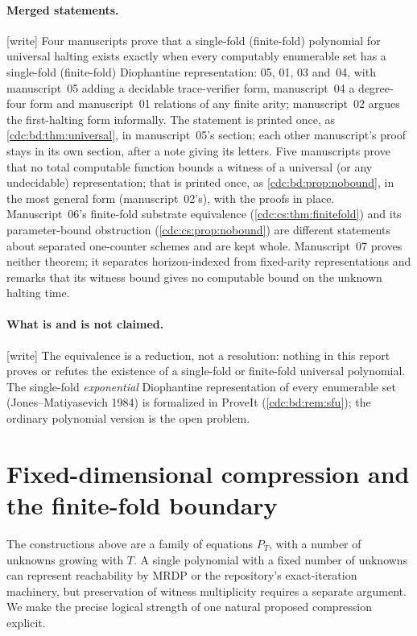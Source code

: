 \documentclass[11pt,a4paper]{article}
\theoremstyle{definition}
\theoremstyle{remark}
\newcommand{\wtag}{\textup{[write]}}%
\newcommand{\srctag}[1]{\texorpdfstring{\hspace{0.5em}{\normalfont\small\color{accent}[#1]}}{ [#1]}}
\begin{document}
\paragraph{Merged statements.} \wtag{} Four manuscripts prove that a single-fold (finite-fold) polynomial for universal halting exists exactly when every computably enumerable set has a single-fold (finite-fold) Diophantine representation: 05, 01, 03 and~04, with manuscript~05 adding a decidable trace-verifier form, manuscript~04 a degree-four form and manuscript~01 relations of any finite arity; manuscript~02 argues the first-halting form informally. The statement is printed once, as \cref{cdc:bd:thm:universal}, in manuscript~05's section; each other manuscript's proof stays in its own section, after a note giving its letters. Five manuscripts prove that no total computable function bounds a witness of a universal (or any undecidable) representation; that is printed once, as \cref{cdc:bd:prop:nobound}, in the most general form (manuscript~02's), with the proofs in place. Manuscript~06's finite-fold substrate equivalence (\cref{cdc:cs:thm:finitefold}) and its parameter-bound obstruction (\cref{cdc:cs:prop:nobound}) are different statements about separated one-counter schemes and are kept whole. Manuscript~07 proves neither theorem; it separates horizon-indexed from fixed-arity representations and remarks that its witness bound gives no computable bound on the unknown halting time.

\paragraph{What is and is not claimed.} \wtag{} The equivalence is a reduction, not a resolution: nothing in this report proves or refutes the existence of a single-fold or finite-fold universal polynomial. The single-fold \emph{exponential} Diophantine representation of every enumerable set (Jones--Matiyasevich 1984) is formalized in ProveIt (\cref{cdc:bd:rem:sfu}); the ordinary polynomial version is the open problem.

\section{Fixed-dimensional compression and the finite-fold boundary\srctag{05}}
\label{cdc:sec:boundary}
The constructions above are a family of equations $P_T$, with a number of unknowns growing with $T$. A single polynomial with a fixed number of unknowns can represent reachability by MRDP or the repository's exact-iteration machinery, but preservation of witness multiplicity requires a separate argument. We make the precise logical strength of one natural proposed compression explicit.
\end{document}

